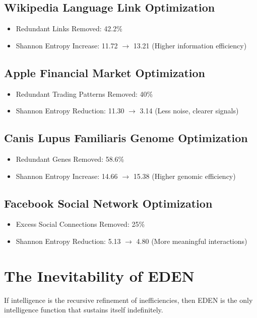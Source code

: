 \documentclass{article}
\begin{document}
\subsection{Wikipedia Language Link Optimization}
\begin{itemize}
    \item Redundant Links Removed: 42.2\%
    \item Shannon Entropy Increase: 11.72 $\rightarrow$ 13.21 (Higher information efficiency)
\end{itemize}

\subsection{Apple Financial Market Optimization}
\begin{itemize}
    \item Redundant Trading Patterns Removed: 40\%
    \item Shannon Entropy Reduction: 11.30 $\rightarrow$ 3.14 (Less noise, clearer signals)
\end{itemize}

\subsection{Canis Lupus Familiaris Genome Optimization}
\begin{itemize}
    \item Redundant Genes Removed: 58.6\%
    \item Shannon Entropy Increase: 14.66 $\rightarrow$ 15.38 (Higher genomic efficiency)
\end{itemize}

\subsection{Facebook Social Network Optimization}
\begin{itemize}
    \item Excess Social Connections Removed: 25\%
    \item Shannon Entropy Reduction: 5.13 $\rightarrow$ 4.80 (More meaningful interactions)
\end{itemize}

\section{The Inevitability of EDEN}

If intelligence is the recursive refinement of inefficiencies, then EDEN is the only intelligence function that sustains itself indefinitely.
\end{document}
